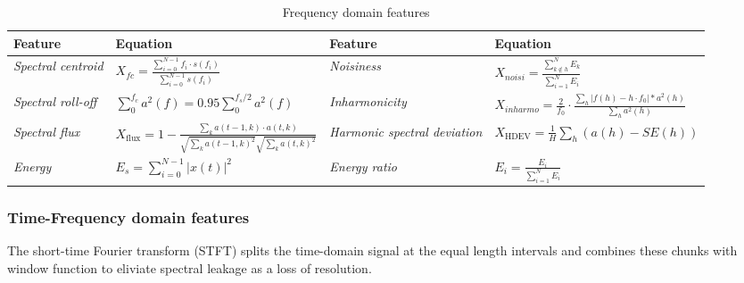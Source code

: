 \begin{table}[h]
\renewcommand{\arraystretch}{1.5}
\begin{adjustbox}{width=\columnwidth,center}
\begin{tabular}{|l|l|l|l|}
\hline
\textbf{Feature}           & \textbf{Equation}                                                                                                 & \textbf{Feature}                     & \textbf{Equation}                                                                               \\ \hline
\textit{Spectral centroid} & $ X_{fc} = \frac{\sum_{i = 0}^{N - 1}{f_i \cdot s(f_i)}}{\sum_{i = 0}^{N - 1}{s(f_i)}}$                           & \textit{Noisiness}                   & $X_{noisi} = \frac{\sum_{k \notin h}^{N}E_k}{\sum_{i = 1}^{N}E_i} $                             \\ \hline
\textit{Spectral roll-off} & $ \sum_{0}^{f_c}a^2(f) = 0.95 \sum_{0}^{f_s / 2}a^2(f)$                                                           & \textit{Inharmonicity}               & $X_{inharmo} = \frac{2}{f_0} \cdot \frac{\sum_h | f(h) - h \cdot f_0| * a^2(h)}{\sum_h a^2(h)}$ \\ \hline
\textit{Spectral flux}     & $X_{\mathrm{flux}} = 1 - \frac{\sum_k a(t-1, k) \cdot a(t,k)}{\sqrt{\sum_k a(t-1, k)^2} \sqrt{\sum_k a(t, k)^2}}$ & \textit{Harmonic spectral deviation} & $ X_{\mathrm{HDEV}} = \frac{1}{H}\sum_h(a(h) - SE(h))$                                          \\ \hline
\textit{Energy}            & $ E_s = \sum_{i = 0}^{N - 1}|x(t)|^2 $                                                                            & \textit{Energy ratio}                & $E_i = \frac{E_i}{\sum_{i = 1}^{N}E_i} $                                                        \\ \hline
\end{tabular}
\end{adjustbox}
\caption{Frequency domain features}
\label{tab:td-features}
\end{table}

\subsubsection{Time-Frequency domain features}
The short-time Fourier transform (STFT) splits the time-domain signal at the equal length intervals and combines these chunks with window function to eliviate spectral leakage as a loss of resolution.
\cite{zhuo_research_2022}
\cite{mostafavi_novel_2021}




